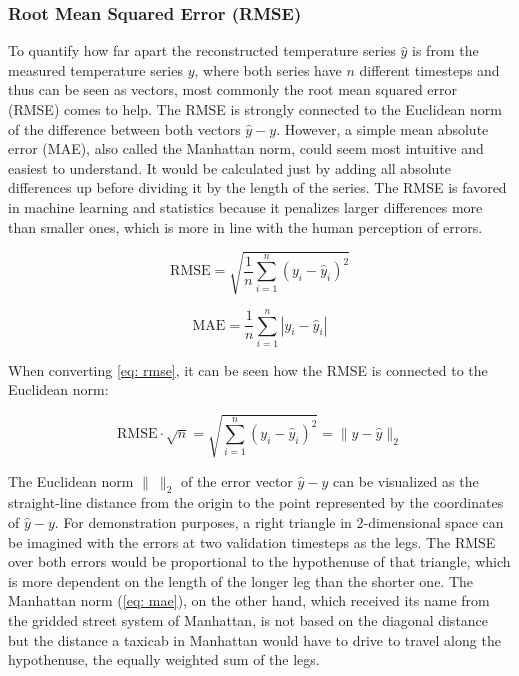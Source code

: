\subsubsection*{Root Mean Squared Error (RMSE)}

To quantify how far apart the reconstructed temperature series $\hat{y}$ is from the measured temperature series $y$, where both series have $n$ different timesteps and thus can be seen as vectors, most commonly the root mean squared error (RMSE) comes to help.
The RMSE is strongly connected to the Euclidean norm of the difference between both vectors $\hat{y} - y$.
However, a simple mean absolute error (MAE), also called the Manhattan norm, could seem most intuitive and easiest to understand.
It would be calculated just by adding all absolute differences up before dividing it by the length of the series.
The RMSE is favored in machine learning and statistics because it penalizes larger differences more than smaller ones, which is more in line with the human perception of errors. 

\begin{equation}
    \text{RMSE} = \sqrt{\frac{1}{n} \sum_{i=1}^{n} (y_i - \hat{y}_i)^2}
    \label{eq: rmse}
\end{equation}

\begin{equation}
    \text{MAE} = \frac{1}{n} \sum_{i=1}^{n} |y_i - \hat{y}_i|
    \label{eq: mae}
\end{equation}

When converting \autoref*{eq: rmse}, it can be seen how the RMSE is connected to the Euclidean norm:

\begin{equation}
  \text{RMSE} \cdot \sqrt{n} = \sqrt{\sum_{i=1}^{n} (y_i - \hat{y}_i)^2} = \| y - \hat{y} \|_2  
  \label{eq: rmse_euclid}
\end{equation}

The Euclidean norm $\| \: \|_2$ of the error vector $\hat{y} - y$ can be visualized as the straight-line distance from the origin to the point represented by the coordinates of $\hat{y} - y$.
For demonstration purposes, a right triangle in 2-dimensional space can be imagined with the errors at two validation timesteps as the legs.
The RMSE over both errors would be proportional to the hypothenuse of that triangle, which is more dependent on the length of the longer leg than the shorter one.
The Manhattan norm (\autoref{eq: mae}), on the other hand, which received its name from the gridded street system of Manhattan, is not based on the diagonal distance but the distance a taxicab in Manhattan would have to drive to travel along the hypothenuse, the equally weighted sum of the legs.

